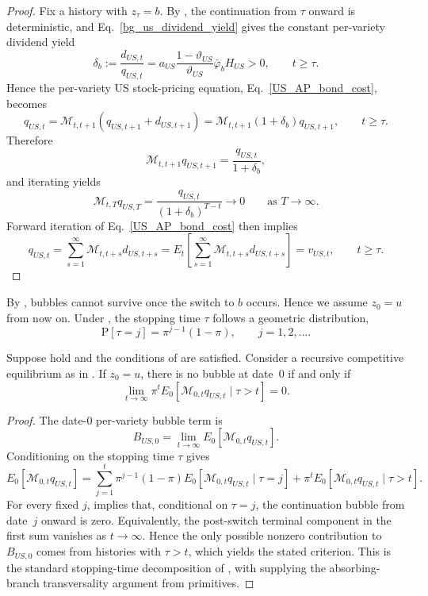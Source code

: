 \documentclass{article}
\begin{document}
\begin{proof}
Fix a history with $z_\tau=b$. By , the continuation from $\tau$ onward is deterministic, and Eq.~\eqref{bg_us_dividend_yield} gives the constant per-variety dividend yield
\[
\delta_b
:=
\frac{d_{US,t}}{q_{US,t}}
=
a_{US}\frac{1-\vartheta_{US}}{\vartheta_{US}}\bar\varphi_b H_{US}
>0,
\qquad
t\ge \tau.
\]
Hence the per-variety US stock-pricing equation, Eq.~\eqref{US_AP_bond_cost}, becomes
\[
q_{US,t}
=
\mathcal M_{t,t+1}(q_{US,t+1}+d_{US,t+1})
=
\mathcal M_{t,t+1}(1+\delta_b)q_{US,t+1},
\qquad
t\ge \tau.
\]
Therefore
\[
\mathcal M_{t,t+1}q_{US,t+1}
=
\frac{q_{US,t}}{1+\delta_b},
\]
and iterating yields
\[
\mathcal M_{t,T}q_{US,T}
=
\frac{q_{US,t}}{(1+\delta_b)^{T-t}}
\to 0
\qquad\text{as }T\to\infty.
\]
Forward iteration of Eq.~\eqref{US_AP_bond_cost} then implies
\[
q_{US,t}
=
\sum_{s=1}^{\infty}\mathcal M_{t,t+s}d_{US,t+s}
=
E_t\!\left[\sum_{s=1}^{\infty}\mathcal M_{t,t+s}d_{US,t+s}\right]
=
v_{US,t},
\qquad
t\ge \tau.
\]
\end{proof}

By , bubbles cannot survive once the switch to $b$ occurs. Hence we assume $z_0=u$ from now on. Under , the stopping time $\tau$ follows a geometric distribution,
\[
\mathrm{P}[\tau=j]=\pi^{j-1}(1-\pi),
\qquad
j=1,2,\ldots.
\]

\begin{prop}\label{prop_no_bubble_criterion}\label{prop2}
Suppose  hold and the conditions of  are satisfied. Consider a recursive competitive equilibrium as in . If $z_0=u$, there is no bubble at date~0 if and only if
\[
\lim_{t\to\infty}\pi^t E_0\!\left[\mathcal M_{0,t}q_{US,t}\mid \tau>t\right]=0.
\]
\end{prop}

\begin{proof}
The date-0 per-variety bubble term is
\[
B_{US,0}
=
\lim_{t\to\infty}E_0\!\left[\mathcal M_{0,t}q_{US,t}\right].
\]
Conditioning on the stopping time $\tau$ gives
\[
E_0\!\left[\mathcal M_{0,t}q_{US,t}\right]
=
\sum_{j=1}^{t}\pi^{j-1}(1-\pi)E_0\!\left[\mathcal M_{0,t}q_{US,t}\mid \tau=j\right]
+
\pi^t E_0\!\left[\mathcal M_{0,t}q_{US,t}\mid \tau>t\right].
\]
For every fixed $j$,  implies that, conditional on $\tau=j$, the continuation bubble from date~$j$ onward is zero. Equivalently, the post-switch terminal component in the first sum vanishes as $t\to\infty$. Hence the only possible nonzero contribution to $B_{US,0}$ comes from histories with $\tau>t$, which yields the stated criterion. This is the standard stopping-time decomposition of \citet{hirano2025technological}, with  supplying the absorbing-branch transversality argument from primitives.
\end{proof}
\end{document}
